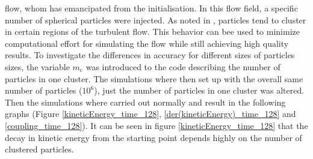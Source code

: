 \documentclass[11pt,a4paper,openany,oneside,parskip=half*]{article}
\begin{document}
flow, whom has emancipated from the initialisation. In this flow field, a specific number of spherical particles were injected. 
\newline
As noted in \cite{PreferentialConcentrationOfHeavyParticles}, particles tend to cluster in certain regions of the turbulent flow. This behavior can bee used to minimize computational effort for simulating the flow while still achieving high quality results. To investigate the differences in accuracy for different sizes of particles sizes, the variable $m_\mathrm{c}$ was introduced to the code describing the number of particles in one cluster. The simulations where then set up with the overall same number of particles ($ 10^6 $), just the number of particles in one cluster was altered. Then the simulations where carried out normally and result in the following graphs (Figure \ref{kineticEnergy_time_128}, \ref{der(kineticEnergy)_time_128} and \ref{coupling_time_128}). 
It can be seen in figure \ref{kineticEnergy_time_128} that the decay in kinetic energy from the starting point depends highly on the number of clustered particles. 
\newline
\end{document}
